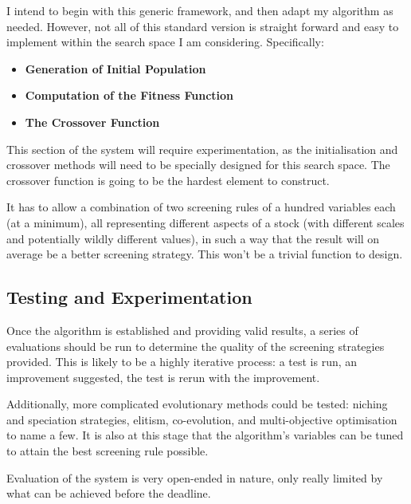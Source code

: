 I intend to begin with this generic framework, and then adapt my algorithm as needed. However, not all of this standard version is straight forward and easy to implement within the search space I am considering. Specifically:
\begin{itemize}
    \item \bf Generation of Initial Population \rm 
    \item \bf Computation of the Fitness Function \rm
    \item \bf The Crossover Function \rm
\end{itemize}

This section of the system will require experimentation, as the initialisation and crossover methods will need to be specially designed for this search space. The crossover function is going to be the hardest element to construct. \newline

It has to allow a combination of two screening rules of a hundred variables each (at a minimum), all representing different aspects of a stock (with different scales and potentially wildly different values), in such a way that the result will on average be a better screening strategy. This won't be a trivial function to design.

\subsection{Testing and Experimentation}
Once the algorithm is established and providing valid results, a series of evaluations should be run to determine the quality of the screening strategies provided. This is likely to be a highly iterative process: a test is run, an improvement suggested, the test is rerun with the improvement. \newline

Additionally, more complicated evolutionary methods could be tested: niching and speciation strategies, elitism, co-evolution, and multi-objective optimisation to name a few. It is also at this stage that the algorithm’s variables can be tuned to attain the best screening rule possible. \newline

Evaluation of the system is very open-ended in nature, only really limited by what can be achieved before the deadline.